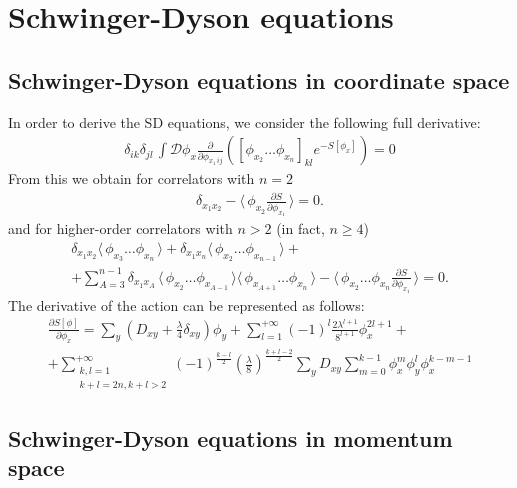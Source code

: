 \documentclass[12pt]{article}
\newcommand{\lr}[1]{ \left( #1 \right) }
\newcommand{\lrs}[1]{ \left[ #1 \right] }
\newcommand{\vev}[1]{ \langle \, #1 \, \rangle }
\begin{document}
\section{Schwinger-Dyson equations}
\label{sec:sd_equations}

\subsection{Schwinger-Dyson equations in coordinate space}
\label{sec:sd_coordinate}

 In order to derive the SD equations, we consider the following full derivative:
\begin{eqnarray}
\label{sd_eqs0}
 \delta_{ik} \delta_{jl} \, \int \mathcal{D}\phi_x \frac{\partial}{\partial \phi_{x_1 \, ij}}
 \lr{
 \lrs{\phi_{x_2} \ldots \phi_{x_n}}_{kl} e^{-S\lrs{\phi_x}}
 } = 0
\end{eqnarray}
From this we obtain for correlators with $n = 2$
\begin{eqnarray}
\label{sd_eqs_G2_coord}
 \delta_{x_1 x_2} - \vev{\phi_{x_2} \frac{\partial S}{\partial \phi_{x_1}} } = 0 .
\end{eqnarray}
and for higher-order correlators with $n > 2$ (in fact, $n \geq 4$)
\begin{eqnarray}
\label{sd_eqs_Gn_coord}
 \delta_{x_1 x_2} \vev{\phi_{x_3} \ldots \phi_{x_n}}
 +
 \delta_{x_1 x_n} \vev{\phi_{x_2} \ldots \phi_{x_{n-1}}}
 + \nonumber \\ +
 \sum\limits_{A=3}^{n-1} \delta_{x_1 x_A} \,
 \vev{\phi_{x_2} \ldots \phi_{x_{A-1}}}
 \vev{\phi_{x_{A+1}} \ldots \phi_{x_n}}
 -
 \vev{\phi_{x_2} \ldots \phi_{x_n} \frac{\partial S}{\partial \phi_{x_1}} } = 0 .
\end{eqnarray}
The derivative of the action can be represented as follows:
\begin{eqnarray}
\label{dSdphi_coord}
 \frac{\partial S\lrs{\phi}}{\partial \phi_x}
 =
 \sum\limits_{y} \lr{D_{xy} + \frac{\lambda}{4} \delta_{x y}} \phi_y
 +
 \sum\limits_{l=1}^{+\infty} \lr{-1}^l \frac{2 \lambda^{l+1}}{8^{l+1}} \phi_x^{2 l + 1}
 + \nonumber \\ +
 \sum\limits_{\substack{k,l=1\\k+l=2 n,k+l>2}}^{+\infty}
 \lr{-1}^{\frac{k-l}{2}} \lr{\frac{\lambda}{8}}^{\frac{k+l-2}{2}}
 \sum\limits_y D_{x y}
 \sum\limits_{m=0}^{k-1}
 \phi_x^m \phi_y^l \phi_x^{k-m-1}
\end{eqnarray}

\subsection{Schwinger-Dyson equations in momentum space}
\label{sec:sd_coordinate}
\end{document}
